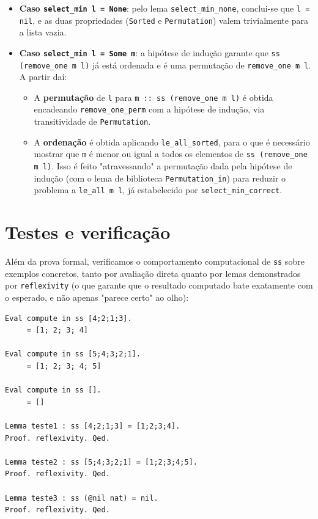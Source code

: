 \documentclass{article}
\begin{document}
\begin{itemize}
  \item \textbf{Caso \texttt{select\_min l = None}}: pelo lema
        \texttt{select\_min\_none}, conclui-se que \texttt{l = nil}, e as
        duas propriedades (\texttt{Sorted} e \texttt{Permutation}) valem
        trivialmente para a lista vazia.
  \item \textbf{Caso \texttt{select\_min l = Some m}}: a hipótese de indução
        garante que \texttt{ss (remove\_one m l)} já está ordenada e é uma
        permutação de \texttt{remove\_one m l}. A partir daí:
        \begin{itemize}
          \item A \textbf{permutação} de \texttt{l} para
                \texttt{m :: ss (remove\_one m l)} é obtida encadeando
                \texttt{remove\_one\_perm} com a hipótese de indução, via
                transitividade de \texttt{Permutation}.
          \item A \textbf{ordenação} é obtida aplicando
                \texttt{le\_all\_sorted}, para o que é necessário mostrar
                que \texttt{m} é menor ou igual a todos os elementos de
                \texttt{ss (remove\_one m l)}. Isso é feito "atravessando"
                a permutação dada pela hipótese de indução (com o lema de
                biblioteca \texttt{Permutation\_in}) para reduzir o problema
                a \texttt{le\_all m l}, já estabelecido por
                \texttt{select\_min\_correct}.
        \end{itemize}
\end{itemize}

\section{Testes e verificação}
\label{sec:testes}

Além da prova formal, verificamos o comportamento computacional de
\texttt{ss} sobre exemplos concretos, tanto por avaliação direta quanto por
lemas demonstrados por \texttt{reflexivity} (o que garante que o resultado
computado bate exatamente com o esperado, e não apenas "parece certo" ao
olho):

\begin{verbatim}
Eval compute in ss [4;2;1;3].
     = [1; 2; 3; 4]

Eval compute in ss [5;4;3;2;1].
     = [1; 2; 3; 4; 5]

Eval compute in ss [].
     = []

Lemma teste1 : ss [4;2;1;3] = [1;2;3;4].
Proof. reflexivity. Qed.

Lemma teste2 : ss [5;4;3;2;1] = [1;2;3;4;5].
Proof. reflexivity. Qed.

Lemma teste3 : ss (@nil nat) = nil.
Proof. reflexivity. Qed.
\end{verbatim}
\end{document}
